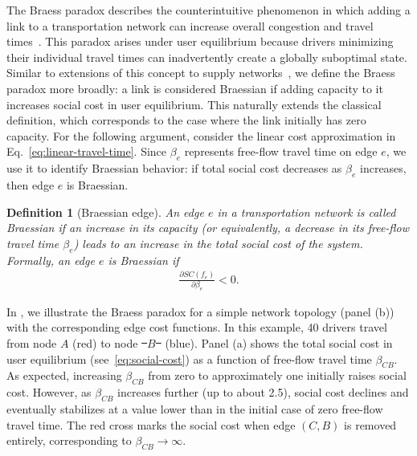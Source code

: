 \documentclass[twocolumn,english,groupedaddress, superscriptaddress,aps,pre,10pt,floatfix]{revtex4-2}
\newtheorem{definition}{Definition}[section]
\providecommand{\DIFaddtex}[1]{{\protect\color{blue}\uwave{#1}}} %
\providecommand{\DIFdeltex}[1]{{\protect\color{red}\sout{#1}}}                      %
\providecommand{\DIFaddbegin}{} %
\providecommand{\DIFaddend}{} %
\providecommand{\DIFdelbegin}{} %
\providecommand{\DIFdelend}{} %
\providecommand{\DIFadd}[1]{\texorpdfstring{\DIFaddtex{#1}}{#1}} %
\providecommand{\DIFdel}[1]{\texorpdfstring{\DIFdeltex{#1}}{}} %
\newcommand{\DIFscaledelfig}{0.5}
\newlength{\DIFdelgraphicswidth} %
\newlength{\DIFdelgraphicsheight} %
\newcommand{\DIFaddincludegraphics}[2][]{{\color{blue}\fbox{\DIFOincludegraphics[#1]{#2}}}} %
\newcommand{\DIFdelincludegraphics}[2][]{%
\sbox{\DIFdelgraphicsbox}{\DIFOincludegraphics[#1]{#2}}%
\settoboxwidth{\DIFdelgraphicswidth}{\DIFdelgraphicsbox} %
\settoboxtotalheight{\DIFdelgraphicsheight}{\DIFdelgraphicsbox} %
\scalebox{\DIFscaledelfig}{%
\parbox[b]{\DIFdelgraphicswidth}{\usebox{\DIFdelgraphicsbox}\\[-\baselineskip] \rule{\DIFdelgraphicswidth}{0em}}\llap{\resizebox{\DIFdelgraphicswidth}{\DIFdelgraphicsheight}{%
\setlength{\unitlength}{\DIFdelgraphicswidth}%
\begin{picture}(1,1)%
\thicklines\linethickness{2pt} %
{\color[rgb]{1,0,0}\put(0,0){\framebox(1,1){}}}%
{\color[rgb]{1,0,0}\put(0,0){\line( 1,1){1}}}%
{\color[rgb]{1,0,0}\put(0,1){\line(1,-1){1}}}%
\end{picture}%
}\hspace*{3pt}}} %
} %
\DeclareRobustCommand{\DIFaddbegin}{\DIFOaddbegin \let\includegraphics\DIFaddincludegraphics} %
\DeclareRobustCommand{\DIFaddend}{\DIFOaddend \let\includegraphics\DIFOincludegraphics} %
\DeclareRobustCommand{\DIFdelbegin}{\DIFOdelbegin \let\includegraphics\DIFdelincludegraphics} %
\DeclareRobustCommand{\DIFdelend}{\DIFOaddend \let\includegraphics\DIFOincludegraphics} %
\begin{document}
The Braess paradox describes the counterintuitive phenomenon in which adding a link to a transportation network can increase overall congestion and travel times~\cite{braess1968paradoxon}. This paradox arises under user equilibrium because drivers minimizing their individual travel times can inadvertently create a globally suboptimal state. Similar to extensions of this concept to supply networks~\citep{schafer2022understanding, manik2022predicting}, we define the Braess paradox more broadly: a link is considered Braessian if adding capacity to it increases social cost in user equilibrium.
This naturally extends the classical definition, which corresponds to the case where the link initially has zero capacity.
For the following argument, consider the linear cost approximation in Eq.~\ref{eq:linear-travel-time}. Since $\beta_e$ represents free-flow travel time on edge $e$, we use it to identify Braessian behavior: if total social cost decreases as $\beta_e$ increases, then edge $e$ is Braessian.

\begin{definition}[Braessian edge]
An edge $e$ in a transportation network is called \emph{Braessian} if an increase in its capacity (or equivalently, a decrease in its free-flow travel time $\beta_e$) leads to an increase in the total social cost of the system. Formally, an edge $e$ is Braessian if
\begin{align}
    \frac{\partial SC(f_e)}{\partial \beta_e} < 0.
\end{align}
\end{definition}

In , we illustrate the Braess paradox for a simple network topology (panel (b)) with the corresponding edge cost functions. In this example, 40 drivers travel from node $A$ (red) to node \DIFdelbegin \DIFdel{\mbox{%
$B$
}%
}\DIFdelend \DIFaddbegin \DIFadd{\mbox{%
$D$
}%
}\DIFaddend (blue). Panel (a) shows the total social cost in user equilibrium (see~\cref{eq:social-cost}) as a function of free-flow travel time $\beta_{CB}$. As expected, increasing $\beta_{CB}$ from zero to approximately one initially raises social cost. However, as $\beta_{CB}$ increases further (up to about 2.5), social cost declines and eventually stabilizes at a value lower than in the initial case of zero free-flow travel time. The red cross marks the social cost when edge $(C,B)$ is removed entirely, corresponding to $\beta_{CB} \rightarrow \infty$.\\
\end{document}

